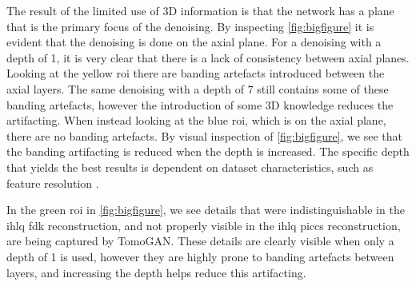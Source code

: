 The result of the limited use of 3D information is that the network has a plane that is the primary focus of the denoising. By inspecting \cref{fig:bigfigure} it is evident that the denoising is done on the axial plane. For a denoising with a depth of 1, it is very clear that there is a lack of consistency between axial planes. Looking at the yellow \gls{roi} there are banding artefacts introduced between the axial layers. The same denoising with a depth of 7 still contains some of these banding artefacts, however the introduction of some 3D knowledge reduces the artifacting. When instead looking at the blue \gls{roi}, which is on the axial plane, there are no banding artefacts. By visual inspection of \cref{fig:bigfigure}, we see that the banding artifacting is reduced when the depth is increased. The specific depth that yields the best results is dependent on dataset characteristics, such as feature resolution \cite{liu2020tomogan}. 

In the green \gls{roi} in \cref{fig:bigfigure}, we see details that were indistinguishable in the \gls{ihlq} \gls{fdk} reconstruction, and not properly visible in the \gls{ihlq} \gls{piccs} reconstruction, are being captured by TomoGAN. These details are clearly visible when only a depth of 1 is used, however they are highly prone to banding artefacts between layers, and increasing the depth helps reduce this artifacting. 


